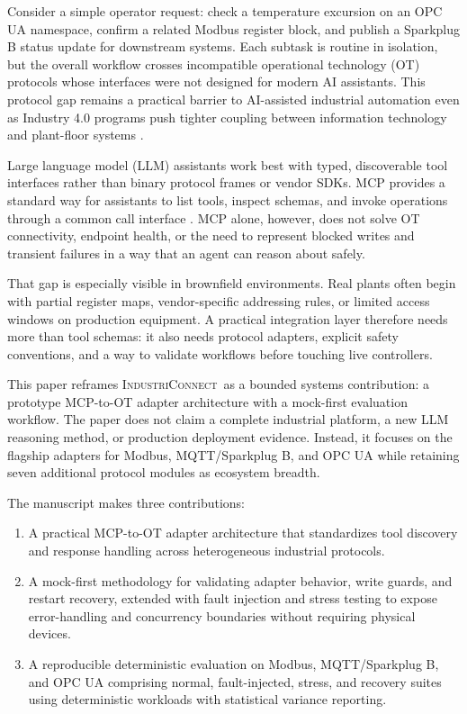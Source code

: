 \documentclass[conference]{IEEEtran}
\newcommand{\system}{\textsc{IndustriConnect}}
\begin{document}
Consider a simple operator request: check a temperature excursion on an OPC UA namespace, confirm a related Modbus register block, and publish a Sparkplug B status update for downstream systems. Each subtask is routine in isolation, but the overall workflow crosses incompatible operational technology (OT) protocols whose interfaces were not designed for modern AI assistants. This protocol gap remains a practical barrier to AI-assisted industrial automation even as Industry 4.0 programs push tighter coupling between information technology and plant-floor systems \cite{xu2018industry4,wollschlaeger2017future}.

Large language model (LLM) assistants work best with typed, discoverable tool interfaces rather than binary protocol frames or vendor SDKs. MCP provides a standard way for assistants to list tools, inspect schemas, and invoke operations through a common call interface \cite{anthropic2024mcp}. MCP alone, however, does not solve OT connectivity, endpoint health, or the need to represent blocked writes and transient failures in a way that an agent can reason about safely.

That gap is especially visible in brownfield environments. Real plants often begin with partial register maps, vendor-specific addressing rules, or limited access windows on production equipment. A practical integration layer therefore needs more than tool schemas: it also needs protocol adapters, explicit safety conventions, and a way to validate workflows before touching live controllers.

This paper reframes \system\ as a bounded systems contribution: a prototype MCP-to-OT adapter architecture with a mock-first evaluation workflow. The paper does not claim a complete industrial platform, a new LLM reasoning method, or production deployment evidence. Instead, it focuses on the flagship adapters for Modbus, MQTT/Sparkplug B, and OPC UA while retaining seven additional protocol modules as ecosystem breadth.

The manuscript makes three contributions:
\begin{enumerate}
    \item A practical MCP-to-OT adapter architecture that standardizes tool discovery and response handling across heterogeneous industrial protocols.
    \item A mock-first methodology for validating adapter behavior, write guards, and restart recovery, extended with fault injection and stress testing to expose error-handling and concurrency boundaries without requiring physical devices.
    \item A reproducible deterministic evaluation on Modbus, MQTT/Sparkplug B, and OPC UA comprising normal, fault-injected, stress, and recovery suites using deterministic workloads with statistical variance reporting.
\end{enumerate}
\end{document}
